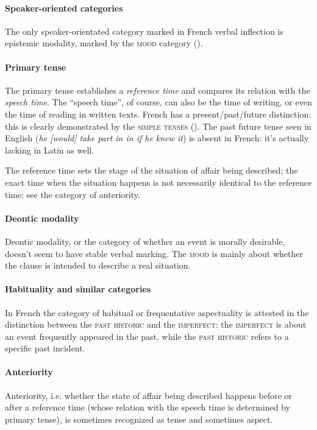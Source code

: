 \documentclass[a4paper, oneside, 12pt]{report}
\newcommand{\form}[1]{\emph{#1}}
\newcommand*{\category}[1]{\textsc{#1}}
\begin{document}
\paragraph*{Speaker-oriented categories} 
The only speaker-orientated category marked in French verbal inflection is epistemic modality,
marked by the \category{mood} category
().

\paragraph*{Primary tense}
The primary tense establishes a \emph{reference time}
and compares its relation with the \emph{speech time}.
The ``speech time'', of course, can also be the time of writing,
or even the time of reading in written texts. 
French has a present/past/future distinction:
this is clearly demonstrated by the \category{simple tenses}
(). 
The past future tense seen in English (\form{he [would] take part in in if he knew it})
is absent in French: it's actually lacking in Latin as well.

The reference time sets the stage of the situation of affair being described;
the exact time when the situation happens is not necessarily identical to the reference time:
see the category of anteriority. 

\paragraph*{Deontic modality}
Deontic modality, or the category of whether an event is morally desirable,
doesn't seem to have stable verbal marking.
The \category{mood} is mainly about whether the clause is intended to describe a real situation.

\paragraph*{Habituality and similar categories}
In French the category of habitual or frequentative aspectuality is attested
in the distinction between the \category{past historic} and the \category{imperfect}:
the \category{imperfect} is about an event frequently appeared in the past,
while the \category{past historic} refers to a specific past incident.

\paragraph*{Anteriority}
Anteriority, i.e. whether the state of affair being described
happens before or after a reference time 
(whose relation with the speech time is determined by primary tense),
is sometimes recognized as tense and sometimes aspect.
\end{document}

